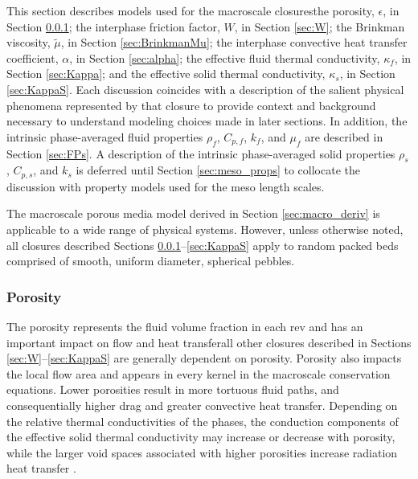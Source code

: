 This section describes models used for the macroscale closures\mdash the porosity, \(\epsilon\), in Section \ref{sec:Porosity}; the interphase friction factor, \(W\), in Section \ref{sec:W}; the Brinkman viscosity, \(\tilde{\mu}\), in Section \ref{sec:BrinkmanMu}; the interphase convective heat transfer coefficient, \(\alpha\), in Section \ref{sec:alpha}; the effective fluid thermal conductivity, \(\kappa_f\), in Section \ref{sec:Kappa}; and the effective solid thermal conductivity, \(\kappa_s\), in Section \ref{sec:KappaS}. Each discussion coincides with a description of the salient physical phenomena represented by that closure to provide context and background necessary to understand modeling choices made in later sections. In addition, the intrinsic phase-averaged fluid properties \(\rho_f\), \(C_{p,f}\), \(k_f\), and \(\mu_f\) are described in Section \ref{sec:FPs}. A description of the intrinsic phase-averaged solid properties \(\rho_s\), \(C_{p,s}\), and \(k_s\) is deferred until Section \ref{sec:meso_props} to collocate the discussion with property models used for the meso length scales.

The macroscale porous media model derived in Section \ref{sec:macro_deriv} is applicable to a wide range of physical systems. However, unless otherwise noted, all closures described Sections \ref{sec:Porosity}--\ref{sec:KappaS} apply to random packed beds comprised of smooth, uniform diameter, spherical pebbles.

\subsubsection{Porosity}
\label{sec:Porosity}

The porosity represents the fluid volume fraction in each \gls{rev} and has an important impact on flow and heat transfer\mdash all other closures described in Sections \ref{sec:W}--\ref{sec:KappaS} are generally dependent on porosity. Porosity also impacts the local flow area and appears in every kernel in the macroscale conservation equations. Lower porosities result in more tortuous fluid paths, and consequentially higher drag and greater convective heat transfer. Depending on the relative thermal conductivities of the phases, the conduction components of the effective solid thermal conductivity may increase or decrease with porosity, while the larger void spaces associated with higher porosities increase radiation heat transfer \cite{you}. 

